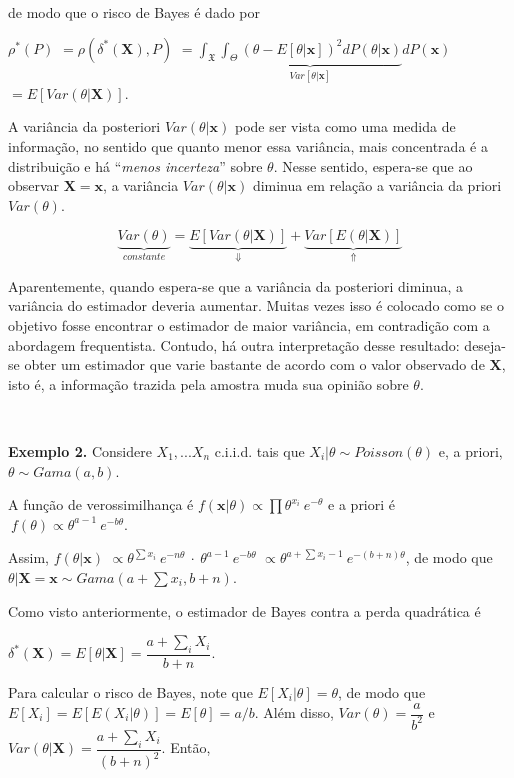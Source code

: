 \documentclass[
]{book}
\begin{document}
de modo que o risco de Bayes é dado por

\({\rho}^*\left(P\right)\) \(=\rho\left(\delta^*(\boldsymbol X),P\right)\) \(=\displaystyle \int_{\mathfrak{X}} \underbrace{ \int_{\Theta}(\theta-E[\theta|\boldsymbol{x}])^2dP(\theta|\boldsymbol{x})}_{Var[\theta|\boldsymbol{x}]}dP(\boldsymbol{x})\) \(=E\left[Var(\theta|\boldsymbol X)\right]\).

A variância da posteriori \(Var(\theta|\boldsymbol x)\) pode ser vista como uma medida de informação, no sentido que quanto menor essa variância, mais concentrada é a distribuição e há ``\emph{menos incerteza}'' sobre \(\theta\). Nesse sentido, espera-se que ao observar \(\boldsymbol X=\boldsymbol x\), a variância \(Var(\theta|\boldsymbol x)\) diminua em relação a variância da priori \(Var(\theta)\).

\[\underbrace{Var(\theta)}_{constante}=\underbrace{E\left[Var(\theta|\boldsymbol X)\right]}_{\boldsymbol \Downarrow}+\underbrace{Var\left[E(\theta|\boldsymbol X)\right]}_{\boldsymbol \Uparrow}\]

Aparentemente, quando espera-se que a variância da posteriori diminua, a variância do estimador deveria aumentar. Muitas vezes isso é colocado como se o objetivo fosse encontrar o estimador de maior variância, em contradição com a abordagem frequentista. Contudo, há outra interpretação desse resultado: deseja-se obter um estimador que varie bastante de acordo com o valor observado de \(\boldsymbol X\), isto é, a informação trazida pela amostra muda sua opinião sobre \(\theta\).

\(~\)

\textbf{Exemplo 2.} Considere \(X_1,...X_n\) c.i.i.d. tais que \(X_i|\theta\sim Poisson(\theta)\) e, a priori, \(\theta \sim Gama(a,b)\).

A função de verossimilhança é \(f(\boldsymbol x | \theta)\propto \prod {\theta}^{x_i}~{e}^{-\theta}\) e a priori é \(~f(\theta)\propto{\theta}^{a-1}~{e}^{-b\theta}\).

Assim, \(f(\theta | \boldsymbol x)\) \(\propto {\theta}^{\sum x_i}~{e}^{-n\theta} ~\cdot~ {\theta}^{a-1}~{e}^{-b\theta}\) \(\propto {\theta}^{a+\sum x_i-1}~{e}^{-(b+n)\theta}\), de modo que \(\theta|\boldsymbol X=\boldsymbol x\sim Gama\left(a+\sum x_i,b+n\right)\).

Como visto anteriormente, o estimador de Bayes contra a perda quadrática é

\(\delta^*(\boldsymbol X)=E[\theta|\boldsymbol X]=\dfrac{a+\sum_iX_i}{b+n}\).

Para calcular o risco de Bayes, note que \(E[X_i|\theta]=\theta\), de modo que \(E[X_i]=E\left[E(X_i|\theta)\right]=E[\theta]=a/b\). Além disso, \(Var(\theta)=\dfrac{a}{b^2}\) e \(Var(\theta|\boldsymbol X)=\dfrac{a+\sum_iX_i}{(b+n)^2}\). Então,
\end{document}

